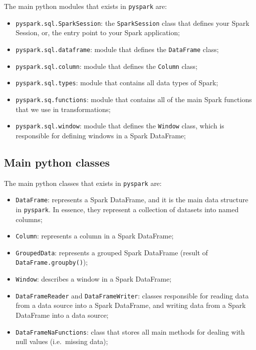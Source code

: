 \documentclass[
  11pt,
  letterpaper,
  DIV=11,
  numbers=noendperiod]{scrreprt}
\providecommand{\tightlist}{%
  \setlength{\itemsep}{0pt}\setlength{\parskip}{0pt}}\usepackage{longtable,booktabs,array}
\begin{document}
The main python modules that exists in \texttt{pyspark} are:

\begin{itemize}
\tightlist
\item
  \texttt{pyspark.sql.SparkSession}: the \texttt{SparkSession} class
  that defines your Spark Session, or, the entry point to your Spark
  application;
\item
  \texttt{pyspark.sql.dataframe}: module that defines the
  \texttt{DataFrame} class;
\item
  \texttt{pyspark.sql.column}: module that defines the \texttt{Column}
  class;
\item
  \texttt{pyspark.sql.types}: module that contains all data types of
  Spark;
\item
  \texttt{pyspark.sq.functions}: module that contains all of the main
  Spark functions that we use in transformations;
\item
  \texttt{pyspark.sql.window}: module that defines the \texttt{Window}
  class, which is responsible for defining windows in a Spark DataFrame;
\end{itemize}

\hypertarget{main-python-classes}{%
\subsection{Main python classes}\label{main-python-classes}}

The main python classes that exists in \texttt{pyspark} are:

\begin{itemize}
\item
  \texttt{DataFrame}: represents a Spark DataFrame, and it is the main
  data structure in \texttt{pyspark}. In essence, they represent a
  collection of datasets into named columns;
\item
  \texttt{Column}: represents a column in a Spark DataFrame;
\item
  \texttt{GroupedData}: represents a grouped Spark DataFrame (result of
  \texttt{DataFrame.groupby()});
\item
  \texttt{Window}: describes a window in a Spark DataFrame;
\item
  \texttt{DataFrameReader} and \texttt{DataFrameWriter}: classes
  responsible for reading data from a data source into a Spark
  DataFrame, and writing data from a Spark DataFrame into a data source;
\item
  \texttt{DataFrameNaFunctions}: class that stores all main methods for
  dealing with null values (i.e.~missing data);
\end{itemize}
\end{document}
